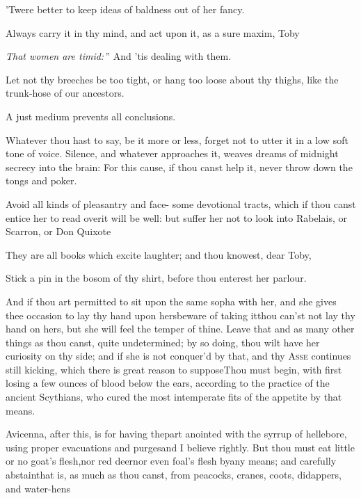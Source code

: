\documentclass[twoside]{article}
\begin{document}
\tsh ’Twere better to keep ideas of baldness out of her
fancy.

Always carry it in thy mind, and act upon it, as a sure maxim,
Toby\tsh

\lqq\textit{That women are timid:}\,” And ’tis\break
{}
dealing with them.

Let not thy breeches be too tight, or hang too loose about thy
thighs, like the trunk-hose of our ancestors.

\tsh A just medium prevents all conclusions.

Whatever thou hast to say, be it more or less, forget not to
utter it in a low soft tone of voice. Silence,
and whatever\break
approaches it, weaves dreams of mid\-night secrecy into the brain:
For this cause, if thou canst help it, never throw down the
tongs and poker.

Avoid all kinds of pleasantry and face-
some devotional tracts, which if thou canst entice her to read
over\tsk it will be well: but suffer her not to look into
Rabelais, or Scarron, or Don Quixote\tsh

\tsh They are all books which excite laughter; and thou
knowest, dear Toby, 

Stick a pin in the bosom of thy shirt, before thou enterest her
parlour.

And if thou art permitted to sit upon the same sopha with her,
and she gives thee occasion to lay thy hand upon hers\tsk beware
of taking it\tsh thou can’st not lay thy hand on hers, but she
will feel the temper of thine. Leave that and as many other
things as thou canst, quite undetermined; by so doing, thou wilt
have her curiosity on thy side; and if she is not conquer’d by
that, and thy \textsc{Asse} continues still kicking, which
there is great reason to suppose\tsh Thou must begin, with first
losing a few ounces of blood below the ears, according to the
practice of the ancient Scythians, who cured the most
intemperate fits of the appetite by that means.

Avicenna, after this, is for having the\break part anointed
with the syrrup of helle\-bore, using proper evacuations and
purges\tsh and I believe rightly. But thou must eat little
or no goat’s flesh,\break nor red deer\tsh nor even
foal’s flesh by\break any means; and carefully
abstain\tsh that is, as much as thou canst, from peacocks,
cranes, coots, didappers, and water-hens\tsh
\end{document}
